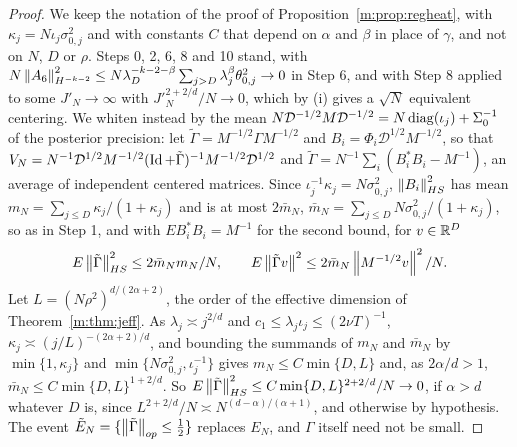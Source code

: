 \begin{proof}
We keep the notation of the proof of Proposition~\ref{m:prop:regheat}, with $\kappa_j=N\iota_j\sigma^2_{0,j}$ and with constants $C$ that depend on $\alpha$ and $\beta$ in place of $\gamma$, and not on $N$, $D$ or $\rho$. Steps 0, 2, 6, 8 and 10 stand, with $N\left\|A_6\right\|^2_{H^{-k-2}}\le N\lambda_D^{-k-2-\beta}\sum_{j>D}\lambda_j^\beta\theta^2_{0,j}\to0$ in Step 6, and with Step 8 applied to some $J'_N\to\infty$ with $J'^{2+2/d}_N/N\to0$, which by (i) gives a $\sqrt N$ equivalent centering. We whiten instead by the mean $N\mathcal D^{-1/2}M\mathcal D^{-1/2}=N\operatorname{diag}(\iota_j)+\Sigma_0^{-1}$ of the posterior precision: let $\tilde\Gamma=M^{-1/2}\Gamma M^{-1/2}$ and $B_i=\Phi_i\mathcal D^{1/2}M^{-1/2}$, so that $V_N=N^{-1}\mathcal D^{1/2}M^{-1/2}(\operatorname{Id}+\tilde\Gamma)^{-1}M^{-1/2}\mathcal D^{1/2}$ and $\tilde\Gamma=N^{-1}\sum_i(B_i^*B_i-M^{-1})$, an average of independent centered matrices. Since $\iota_j^{-1}\kappa_j=N\sigma^2_{0,j}$, $\left\|B_i\right\|^2_{HS}$ has mean $m_N=\sum_{j\le D}\kappa_j/(1+\kappa_j)$ and is at most $2\bar m_N$, $\bar m_N=\sum_{j\le D}N\sigma^2_{0,j}/(1+\kappa_j)$, so as in Step 1, and with $EB_i^*B_i=M^{-1}$ for the second bound, for $v\in\mathbb{R}^D$
\[
E\left\|\tilde\Gamma\right\|^2_{HS}\le2\bar m_Nm_N/N,\qquad E\left\|\tilde\Gamma v\right\|^2\le2\bar m_N\left\|M^{-1/2}v\right\|^2/N .
\]
Let $L=(N\rho^2)^{d/(2\alpha+2)}$, the order of the effective dimension of Theorem~\ref{m:thm:jeff}. As $\lambda_j\asymp j^{2/d}$ and $c_1\le\lambda_j\iota_j\le(2\nu T)^{-1}$, $\kappa_j\asymp(j/L)^{-(2\alpha+2)/d}$, and bounding the summands of $m_N$ and $\bar m_N$ by $\min\{1,\kappa_j\}$ and $\min\{N\sigma^2_{0,j},\iota_j^{-1}\}$ gives $m_N\le C\min\{D,L\}$ and, as $2\alpha/d>1$, $\bar m_N\le C\min\{D,L\}^{1+2/d}$. So $E\left\|\tilde\Gamma\right\|^2_{HS}\le C\min\{D,L\}^{2+2/d}/N\to0$, if $\alpha>d$ whatever $D$ is, since $L^{2+2/d}/N\asymp N^{(d-\alpha)/(\alpha+1)}$, and otherwise by hypothesis. The event $\tilde E_N=\{\left\|\tilde\Gamma\right\|_{op}\le\frac12\}$ replaces $E_N$, and $\Gamma$ itself need not be small.


\end{proof}
